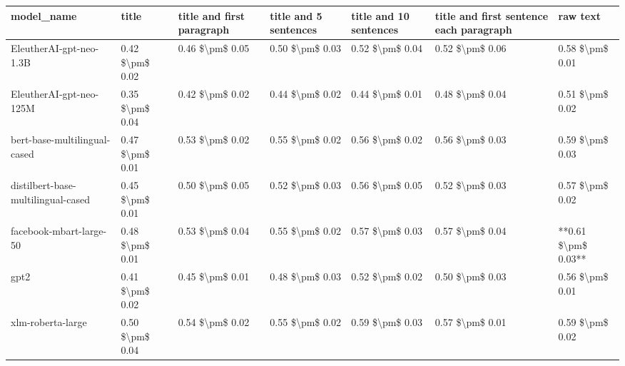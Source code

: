 \begin{tabular}{lllllll}
\toprule
                        model\_name &           title & title and first paragraph & title and 5 sentences & title and 10 sentences & title and first sentence each paragraph &            raw text \\
\midrule
           EleutherAI-gpt-neo-1.3B & 0.42 \$\textbackslash pm\$ 0.02 &           0.46 \$\textbackslash pm\$ 0.05 &       0.50 \$\textbackslash pm\$ 0.03 &        0.52 \$\textbackslash pm\$ 0.04 &                         0.52 \$\textbackslash pm\$ 0.06 &     0.58 \$\textbackslash pm\$ 0.01 \\
           EleutherAI-gpt-neo-125M & 0.35 \$\textbackslash pm\$ 0.04 &           0.42 \$\textbackslash pm\$ 0.02 &       0.44 \$\textbackslash pm\$ 0.02 &        0.44 \$\textbackslash pm\$ 0.01 &                         0.48 \$\textbackslash pm\$ 0.04 &     0.51 \$\textbackslash pm\$ 0.02 \\
      bert-base-multilingual-cased & 0.47 \$\textbackslash pm\$ 0.01 &           0.53 \$\textbackslash pm\$ 0.02 &       0.55 \$\textbackslash pm\$ 0.02 &        0.56 \$\textbackslash pm\$ 0.02 &                         0.56 \$\textbackslash pm\$ 0.03 &     0.59 \$\textbackslash pm\$ 0.03 \\
distilbert-base-multilingual-cased & 0.45 \$\textbackslash pm\$ 0.01 &           0.50 \$\textbackslash pm\$ 0.05 &       0.52 \$\textbackslash pm\$ 0.03 &        0.56 \$\textbackslash pm\$ 0.05 &                         0.52 \$\textbackslash pm\$ 0.03 &     0.57 \$\textbackslash pm\$ 0.02 \\
           facebook-mbart-large-50 & 0.48 \$\textbackslash pm\$ 0.01 &           0.53 \$\textbackslash pm\$ 0.04 &       0.55 \$\textbackslash pm\$ 0.02 &        0.57 \$\textbackslash pm\$ 0.03 &                         0.57 \$\textbackslash pm\$ 0.04 & **0.61 \$\textbackslash pm\$ 0.03** \\
                              gpt2 & 0.41 \$\textbackslash pm\$ 0.02 &           0.45 \$\textbackslash pm\$ 0.01 &       0.48 \$\textbackslash pm\$ 0.03 &        0.52 \$\textbackslash pm\$ 0.02 &                         0.50 \$\textbackslash pm\$ 0.03 &     0.56 \$\textbackslash pm\$ 0.01 \\
                 xlm-roberta-large & 0.50 \$\textbackslash pm\$ 0.04 &           0.54 \$\textbackslash pm\$ 0.02 &       0.55 \$\textbackslash pm\$ 0.02 &        0.59 \$\textbackslash pm\$ 0.03 &                         0.57 \$\textbackslash pm\$ 0.01 &     0.59 \$\textbackslash pm\$ 0.02 \\
\bottomrule
\end{tabular}
